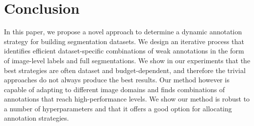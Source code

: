 \section{Conclusion}
\label{sec:fullweak_conclusion}
In this paper, we propose a novel approach to determine a dynamic annotation strategy for building segmentation datasets. We design an iterative process that identifies efficient dataset-specific combinations of weak annotations in the form of image-level labels and full segmentations. We show in our experiments that the best strategies are often dataset and budget-dependent, and therefore the trivial approaches do not always produce the best results. Our method however is capable of adapting to different image domains and finds combinations of annotations that reach high-performance levels. We show our method is robust to a number of hyperparameters and that it offers a good option for allocating annotation strategies. 
